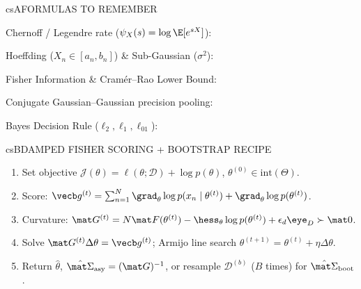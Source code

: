 \documentclass[../../../../master.tex]{subfiles}
\begin{document}
\begin{cscolumns}
\begin{cscard}{csA}{FORMULAS TO REMEMBER}
  \begin{csbul}
    \item Chernoff / Legendre rate ($\psi_X(s)=\log\E[e^{sX}]$):
    \item Hoeffding ($X_n\in[a_n,b_n]$) \& Sub-Gaussian ($\sigma^2$):
    \item Fisher Information \& Cram\'er--Rao Lower Bound:
    \item Conjugate Gaussian--Gaussian precision pooling:
    \item Bayes Decision Rule ($\ell_2,\ell_1,\ell_{01}$):
  \end{csbul}
\end{cscard}

\begin{cscard}{csB}{DAMPED FISHER SCORING + BOOTSTRAP RECIPE}
  \begin{enumerate}[leftmargin=1.2em, itemsep=1pt, topsep=1pt, parsep=0pt]
    \item Set objective $\mathcal J(\theta)=\ell(\theta;\mathcal D)+\log p(\theta)$, $\theta^{(0)}\in\mathrm{int}(\Theta)$.
    \item Score: $\vecb g^{(t)}=\sum_{n=1}^N\grad_\theta\log p(x_n\mid\theta^{(t)})+\grad_\theta\log p(\theta^{(t)})$.
    \item Curvature: $\mat G^{(t)}=N\mat F(\theta^{(t)})-\hess_\theta\log p(\theta^{(t)})+\epsilon_d\eye_D\succ\mat 0$.
    \item Solve $\mat G^{(t)}\Delta\theta=\vecb g^{(t)}$; Armijo line search $\theta^{(t+1)}=\theta^{(t)}+\eta\Delta\theta$.
    \item Return $\hat\theta$, $\hat{\mat\Sigma}_{\mathrm{asy}}=(\mat G)^{{-1}}$, or resample $\mathcal D^{(b)}$ ($B$ times) for $\hat{\mat\Sigma}_{\mathrm{boot}}$.
  \end{enumerate}
\end{cscard}
\columnbreak


\end{cscolumns}
\end{document}
